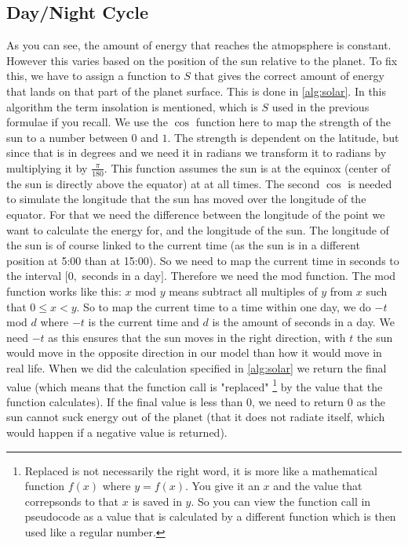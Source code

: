 \subsection{Day/Night Cycle} \label{sec:daynight}
As you can see, the amount of energy that reaches the atmopsphere is constant. However this varies based on the position of the sun relative to the planet. To fix this, we have to assign a 
function to $S$ that gives the correct amount of energy that lands on that part of the planet surface. This is done in \autoref{alg:solar}. In this algorithm the term insolation is mentioned, 
which is $S$ used in the previous formulae if you recall. We use the $\cos$ function here to map the strength of the sun to a number between $0$ and $1$. The strength is dependent on the latitude, 
but since that is in degrees and we need it in radians we transform it to radians by multiplying it by $\frac{\pi}{180}$. This function assumes the sun is at the equinox (center of the sun is 
directly above the equator) \cite{equinox} at at all times. The second $\cos$ is needed to simulate the longitude that the sun has moved over the longitude of the equator. For that we need the 
difference between the longitude of the point we want to calculate the energy for, and the longitude of the sun. The longitude of the sun is of course linked to the current time (as the sun is 
in a different position at 5:00 than at 15:00). So we need to map the current time in seconds to the interval $[0,$ seconds in a day$]$. Therefore we need the mod function. The mod function 
works like this: $x$ mod $y$ means subtract all multiples of $y$ from $x$ such that $0 \leq x < y$. So to map the current time to a time within one day, we do $-t$ mod $d$ where $-t$ is the 
current time and $d$ is the amount of seconds in a day. We need $-t$ as this ensures that the sun moves in the right direction, with $t$ the sun would move in the opposite direction in our model 
than how it would move in real life. When we did the calculation specified in \autoref{alg:solar} we return the final value (which means that the function call is "replaced" 
\footnote{Replaced is not necessarily the right word, it is more like a mathematical function $f(x)$ where $y = f(x)$. You give it an $x$ and the value that correpsonds to that $x$ is saved in 
$y$. So you can view the function call in pseudocode as a value that is calculated by a different function which is then used like a regular number.} by the value that the function calculates). 
If the final value is less than 0, we need to return 0 as the sun cannot suck energy out of the planet (that it does not radiate itself, which would happen if a negative value is returned).

